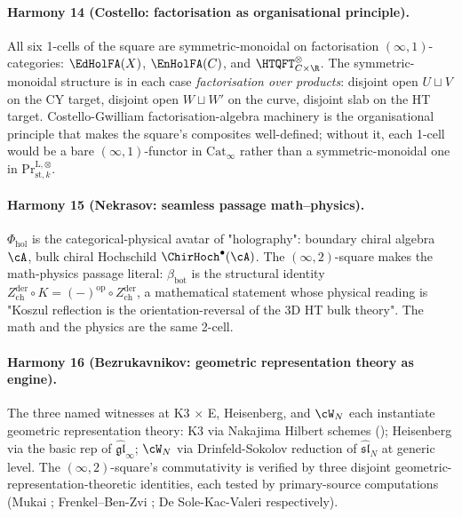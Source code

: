 \paragraph*{Harmony 14 (Costello: factorisation as organisational
principle).} All six 1-cells of the square are symmetric-monoidal on
factorisation $(\infty,1)$-categories: $\EdHolFA(X)$, $\EnHolFA(C)$,
and $\HTQFT_{C\times\R}^{\otimes}$. The symmetric-monoidal structure
is in each case \emph{factorisation over products}: disjoint open $U\sqcup V$
on the CY target, disjoint open $W\sqcup W'$ on the curve, disjoint slab
on the HT target. Costello-Gwilliam factorisation-algebra machinery is
the organisational principle that makes the square's composites
well-defined; without it, each 1-cell would be a bare $(\infty,1)$-functor
in $\mathrm{Cat}_\infty$ rather than a symmetric-monoidal one in
$\mathrm{Pr}^{\mathrm{L},\otimes}_{\mathrm{st},k}$.

\paragraph*{Harmony 15 (Nekrasov: seamless passage math--physics).}
$\Phi_{\mathrm{hol}}$ is the categorical-physical avatar of "holography":
boundary chiral algebra $\cA$, bulk chiral Hochschild
$\ChirHoch^\bullet(\cA)$. The $(\infty,2)$-square makes the math-physics
passage literal: $\beta_{\mathrm{bot}}$ is the structural identity
$Z^{\mathrm{der}}_{\mathrm{ch}}\circ K = (-)^{\mathrm{op}}\circ
Z^{\mathrm{der}}_{\mathrm{ch}}$, a mathematical statement whose
physical reading is "Koszul reflection is the orientation-reversal of
the 3D HT bulk theory". The math and the physics are the same 2-cell.

\paragraph*{Harmony 16 (Bezrukavnikov: geometric representation theory as
engine).} The three named witnesses at K3 $\times$ E, Heisenberg, and
$\cW_N$ each instantiate geometric representation theory: K3 via
Nakajima Hilbert schemes (\cite{Nakajima1994ManyPapers}); Heisenberg
via the basic rep of $\hat{\mathfrak{gl}}_\infty$; $\cW_N$ via
Drinfeld-Sokolov reduction of $\hat{\mathfrak{sl}}_N$ at generic
level. The $(\infty,2)$-square's commutativity is verified by three
disjoint geometric-representation-theoretic identities, each tested by
primary-source computations (Mukai \cite{Mukai1981}; Frenkel--Ben-Zvi
\cite{FrenkelBenZvi2004}; De Sole-Kac-Valeri \cite{DSKV2016}
respectively).

